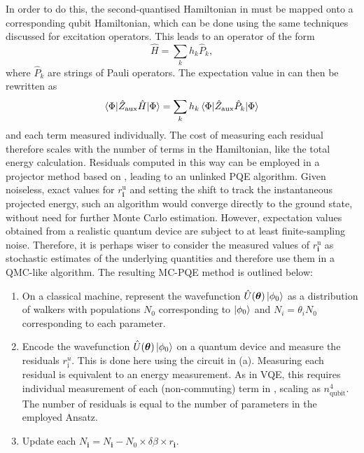 \documentclass[%
 reprint,
 amsmath,amssymb,
 aps,
]{revtex4-2}
\begin{document}
{{In order to do this, the second-quantised Hamiltonian in  must be mapped onto a corresponding qubit Hamiltonian, which can be done using the same techniques discussed for excitation operators. This leads to an operator of the form
\begin{equation}
    \hat H = \sum_k h_k \hat P_k,
    \label{eq:qubit_ham}
\end{equation}
where $\hat P_k$ are strings of Pauli operators. The expectation value in  can then be rewritten as
\begin{equation}
 \braket{\Phi|\hat Z_\mathrm{aux}\hat H|\Phi} = \sum_k h_k\braket{\Phi|\hat Z_\mathrm{aux}\hat P_k|\Phi}   
\end{equation}
and each term measured individually. The cost of measuring each residual therefore scales with the number of terms in the Hamiltonian, like the total energy calculation.} Residuals computed in this way can be employed in a projector method based on , leading to an unlinked PQE algorithm. Given noiseless, exact values for $r_\mathbf{i}^\mathrm{u}$ and setting the shift to track the instantaneous projected energy, such an algorithm would converge directly to the ground state, without need for further Monte Carlo estimation. { However, expectation values obtained from a realistic quantum device are subject to at least finite-sampling noise. Therefore, it is perhaps wiser to consider the measured values of $r_\mathbf{i}^\mathrm{u}$ as stochastic estimates of the underlying quantities and therefore use them in a QMC-like algorithm. The resulting MC-PQE method is outlined below}:
\begin{enumerate}
    \item On a classical machine, represent the wavefunction $\hat U (\boldsymbol{\theta})\ket{\phi_0}$ as a distribution of walkers with populations $N_0$ corresponding to $\ket{\phi_0}$ and $N_i = \theta_i N_0$ corresponding to each parameter.
    \item Encode the wavefunction $\hat U (\boldsymbol{\theta})\ket{\phi_0}$ on a quantum device and measure the residuals $r^u_\mathrm{i}$. { This is done here using the circuit in  (a). Measuring each residual is equivalent to an energy measurement. As in VQE, this requires individual measurement of each (non-commuting) term in , scaling as $n_\mathrm{qubit}^4$. The number of residuals is equal to the number of parameters in the employed Ansatz.}
    \item Update each $N_\mathbf{i} = N_\mathbf{i} - N_0 \times \delta\beta \times r_\mathbf{i}$.

\end{enumerate}}
\end{document}
